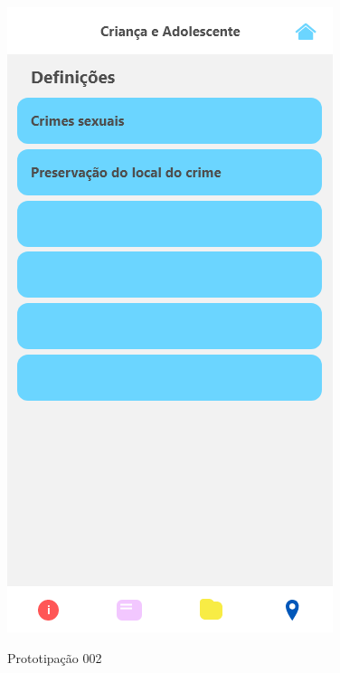 \documentclass[
	12pt,				%
	openright,			%
	oneside,			%
	a4paper,			%
	english,			%
	brazil,				%
	]{abntex2}
\theoremstyle{theorem}
\theoremstyle{definition}
\begin{document}
\begin{figure}[H]
\begin{minipage}{.3\textwidth}
  \includegraphics[width=.9\linewidth]{imagens/prototipoDefinicoes.png}
  \label{fig: Tela de definições}
\end{minipage}
\caption{Prototipação 002}
\end{figure}
\end{document}
